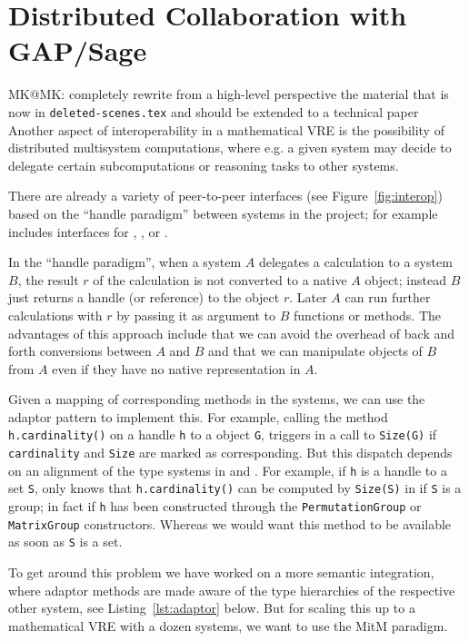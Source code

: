 \section{Distributed Collaboration with GAP/Sage}\label{sec:gapsage}
\begin{newpart}{MK@MK: completely rewrite from a high-level perspective the material that
    is now in \texttt{deleted-scenes.tex} and should be extended to a technical paper}
Another aspect of interoperability in a mathematical VRE is the possibility of distributed
multisystem computations, where e.g. a given system may decide to delegate
certain subcomputations or reasoning tasks to other systems.

There are already a variety of peer-to-peer interfaces (see Figure~\ref{fig:interop})
based on the ``handle paradigm'' between systems in the \ODK project;
for example \Sage includes interfaces for \GAP, \Singular, or \Pari.

In the ``handle paradigm'', when a system $A$ delegates a calculation to a system $B$, the
result $r$ of the calculation is not converted to a native $A$ object; instead $B$ just
returns a handle (or reference) to the object $r$. Later $A$ can run further calculations
with $r$ by passing it as argument to $B$ functions or methods. The advantages of this
approach include that we can avoid the overhead of back and forth conversions between $A$
and $B$ and that we can manipulate objects of $B$ from $A$ even if they have no native
representation in $A$.

Given a mapping of corresponding methods in the systems, we can use the adaptor pattern to
implement this. For example, calling the method \texttt{h.cardinality()} on a \Sage handle
\texttt{h} to a \GAP object \texttt{G}, triggers in \GAP a call to \texttt{Size(G)} if
\texttt{cardinality} and \texttt{Size} are marked as corresponding. But this dispatch
depends on an alignment of the type systems in \Sage and \GAP. For example, if \texttt{h}
is a handle to a set \texttt{S}, \Sage only knows that \texttt{h.cardinality()} can be
computed by \texttt{Size(S)} in \GAP if \texttt{S} is a group; in fact if \texttt{h} has
been constructed through the \texttt{PermutationGroup} or \texttt{MatrixGroup}
constructors. Whereas we would want this method to be available as soon as \texttt{S} is a
set.

To get around this problem we have worked on a more semantic integration, where adaptor
methods are made aware of the type hierarchies of the respective other system, see
Listing~\ref{lst:adaptor} below. But for scaling this up to a mathematical VRE with a
dozen systems, we want to use the MitM paradigm.
 

\end{newpart}
